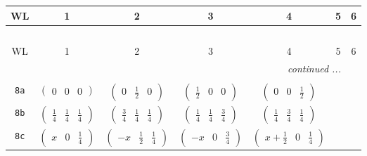 \documentclass[fleqn,9pt,landscape]{jsarticle}
\begin{document}
\begin{center}
\renewcommand{\arraystretch}{1.2}
\begin{longtable}{ccccccc}
 \hline \hline
WL & 1 & 2 & 3 & 4 & 5 & 6 \\ \hline \endfirsthead

\multicolumn{6}{l}{\tablename\ \thetable{}} \\
 \hline \hline
WL & 1 & 2 & 3 & 4 & 5 & 6 \\ \hline \endhead

 \hline \hline
\multicolumn{6}{r}{\footnotesize\it continued ...} \\ \endfoot

 \hline \hline
\multicolumn{6}{r}{} \\ \endlastfoot

{\tt 8a} & $ \begin{pmatrix} 0 & 0 & 0 \end{pmatrix} $ & $ \begin{pmatrix} 0 & \frac{1}{2} & 0 \end{pmatrix} $ & $ \begin{pmatrix} \frac{1}{2} & 0 & 0 \end{pmatrix} $ & $ \begin{pmatrix} 0 & 0 & \frac{1}{2} \end{pmatrix} $ & $  $ & $  $ \\ \hline
{\tt 8b} & $ \begin{pmatrix} \frac{1}{4} & \frac{1}{4} & \frac{1}{4} \end{pmatrix} $ & $ \begin{pmatrix} \frac{3}{4} & \frac{1}{4} & \frac{1}{4} \end{pmatrix} $ & $ \begin{pmatrix} \frac{1}{4} & \frac{1}{4} & \frac{3}{4} \end{pmatrix} $ & $ \begin{pmatrix} \frac{1}{4} & \frac{3}{4} & \frac{1}{4} \end{pmatrix} $ & $  $ & $  $ \\ \hline
{\tt 8c} & $ \begin{pmatrix} x & 0 & \frac{1}{4} \end{pmatrix} $ & $ \begin{pmatrix} - x & \frac{1}{2} & \frac{1}{4} \end{pmatrix} $ & $ \begin{pmatrix} - x & 0 & \frac{3}{4} \end{pmatrix} $ & $ \begin{pmatrix} x + \frac{1}{2} & 0 & \frac{1}{4} \end{pmatrix} $ & $  $ & $  $ \\ \hline

\end{longtable}
\end{center}
\end{document}

